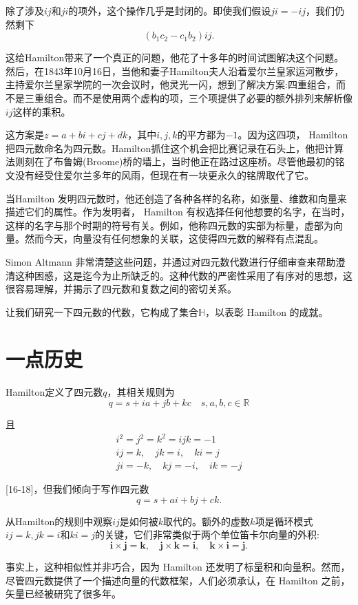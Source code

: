 除了涉及$i j$和$j i$的项外，这个操作几乎是封闭的。即使我们假设$j i=-i j$，我们仍然剩下
$$
\left(b_{1} c_{2}-c_{1} b_{2}\right) i j .
$$

这给Hamilton带来了一个真正的问题，他花了十多年的时间试图解决这个问题。然后，在1843年10月16日，当他和妻子Hamilton夫人沿着爱尔兰皇家运河散步，主持爱尔兰皇家学院的一次会议时，他灵光一闪，想到了解决方案:四重组合，而不是三重组合。而不是使用两个虚构的项，三个项提供了必要的额外排列来解析像$i j$这样的乘积。

这方案是$z=a+ bi +c j+d k$，其中$i, j, k$的平方都为$-1$。因为这四项， Hamilton 把四元数命名为四元数。Hamilton抓住这个机会把比赛记录在石头上，他把计算法则刻在了布鲁姆(Broome)桥的墙上，当时他正在路过这座桥。尽管他最初的铭文没有经受住爱尔兰多年的风雨，但现在有一块更永久的铭牌取代了它。

当Hamilton 发明四元数时，他还创造了各种各样的名称，如张量、维数和向量来描述它们的属性。作为发明者， Hamilton 有权选择任何他想要的名字，在当时，这样的名字与那个时期的符号有关。例如，他称四元数的实部为标量，虚部为向量。然而今天，向量没有任何想象的关联，这使得四元数的解释有点混乱。

Simon Altmann 非常清楚这些问题，并通过对四元数代数进行仔细审查来帮助澄清这种困惑，这是迄今为止所缺乏的。这种代数的严密性采用了有序对的思想，这很容易理解，并揭示了四元数和复数之间的密切关系。

让我们研究一下四元数的代数，它构成了集合$\mathbb{H}$，以表彰 Hamilton 的成就。

\section{一点历史}
Hamilton定义了四元数$q$，其相关规则为
$$
q=s+i a+j b+k c \quad s, a, b, c \in \mathbb{R}
$$

且
$$
\begin{gathered}
i^{2}=j^{2}=k^{2}=i j k=-1 \\
i j=k, \quad j k=i, \quad k i=j \\
j i=-k, \quad k j=-i, \quad i k=-j
\end{gathered}
$$

[16-18]，但我们倾向于写作四元数
$$
q=s+a i+b j+c k .
$$

从Hamilton的规则中观察$i j$是如何被$k$取代的。额外的虚数$k$项是循环模式$i j=k, j k=i$和$k i=j$的关键，它们非常类似于两个单位笛卡尔向量的外积:
$$
\mathbf{i} \times \mathbf{j}=\mathbf{k}, \quad \mathbf{j} \times \mathbf{k}=\mathbf{i}, \quad \mathbf{k} \times \mathbf{i}=\mathbf{j} .
$$

事实上，这种相似性并非巧合，因为 Hamilton 还发明了标量积和向量积。然而，尽管四元数提供了一个描述向量的代数框架，人们必须承认，在 Hamilton 之前，矢量已经被研究了很多年。

